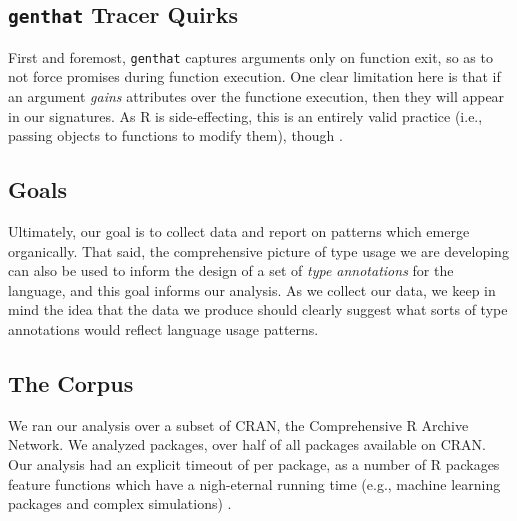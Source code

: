 \documentclass[acmsmall,10pt,review,anonymous]{acmart}\settopmatter{printfolios=true,printccs=false,printacmref=false}
\begin{document}


%
%
%
%
\subsection{{\tt genthat} Tracer Quirks}

First and foremost, {\tt genthat} captures arguments only on function exit,
so as to not force promises during function execution.   One
clear limitation here is that if an argument \textit{gains} attributes over
the functione execution, then they will appear in our signatures.  As R is
side-effecting, this is an entirely valid practice (i.e., passing objects to
functions to modify them), though .


%
%
%
%
\subsection{Goals}

Ultimately, our goal is to collect data and report on patterns which emerge
organically.  That said, the comprehensive picture of type usage we are
developing can also be used to inform the design of a set of \textit{type
  annotations} for the language, and this goal informs our analysis.  As we
collect our data, we keep in mind the idea that the data we produce should
clearly suggest what sorts of type annotations would reflect language usage
patterns.

%
%
%
%
\subsection{The Corpus}


We ran our analysis over a subset of CRAN, the Comprehensive R Archive
Network.  We analyzed  packages, over half of all packages
available on CRAN.  Our analysis had an explicit timeout of 
per package, as a number of R packages feature functions which have a
nigh-eternal running time (e.g., machine learning packages and complex
simulations) .
\end{document}
